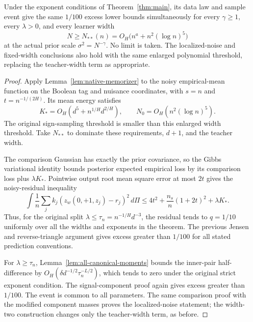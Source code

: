 \begin{theorem}
\label{thm:all-canonical}
Under the exponent conditions of Theorem~\ref{thm:main}, its data law and sample event give the same $1/100$ excess lower bounds simultaneously for every $\gamma\ge1$, every $\lambda>0$, and every learner width
\[
 N\ge N_{**}(n)=O_H\bigl(n^a+n^2(\log n)^5\bigr)
\]
at the actual prior scale $\sigma^2=N^{-\gamma}$. No limit is taken. The localized-noise and fixed-width conclusions also hold with the same enlarged polynomial threshold, replacing the teacher-width term as appropriate.
\end{theorem}
\begin{proof}
Apply Lemma~\ref{lem:native-memorizer} to the noisy empirical-mean function on the Boolean tag and nuisance coordinates, with $s=n$ and $t=n^{-1/(2H)}$. Its mean energy satisfies
\[
 K_*=O_H(d^5+n^{1/H}d^{2/H}),\qquad
 N_0=O_H(n^2(\log n)^5).
\]
The original sign-sampling threshold is smaller than this enlarged width threshold. Take $N_{**}$ to dominate these requirements, $d+1$, and the teacher width.

The comparison Gaussian has exactly the prior covariance, so the Gibbs variational identity bounds posterior expected empirical loss by its comparison loss plus $\lambda K_*$. Pointwise output root mean square error at most $2t$ gives the noisy-residual inequality
\[
 \int\frac1n\sum_j k_j(z_w(0,+1,z_j)-r_j)^2\,d\Pi
 \le4t^2+\frac{n_s}{n}(1+2t)^2+\lambda K_*.
\]
Thus, for the original split $\lambda\le\tau_n=n^{-1/H}d^{-3}$, the residual tends to $q=1/10$ uniformly over all the widths and exponents in the theorem. The previous Jensen and reverse-triangle argument gives excess greater than $1/100$ for all stated prediction conventions.

For $\lambda\ge\tau_n$, Lemma~\ref{lem:all-canonical-moments} bounds the inner-pair half-difference by $O_H(\delta d^{-1/2}\tau_n^{-L/2})$, which tends to zero under the original strict exponent condition. The signal-component proof again gives excess greater than $1/100$. The event is common to all parameters. The same comparison proof with the modified component masses proves the localized-noise statement; the width-two construction changes only the teacher-width term, as before.
\end{proof}
